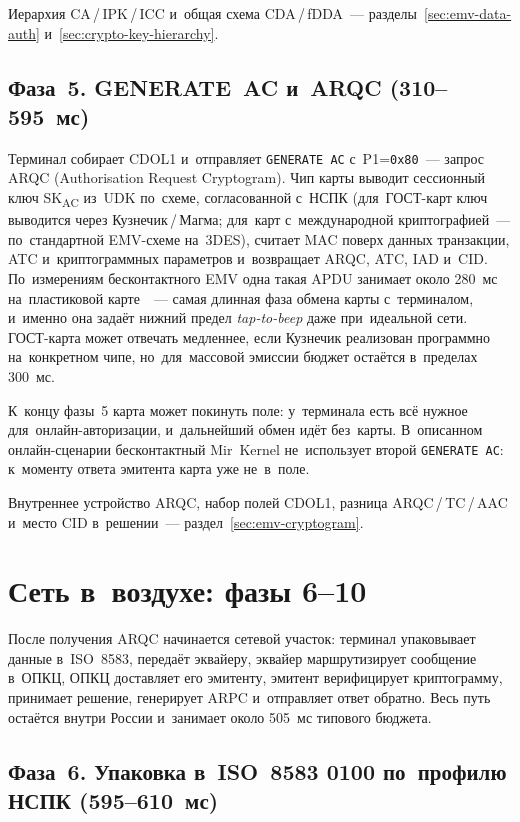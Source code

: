 Иерархия CA\,/\,IPK\,/\,ICC и~общая схема CDA\,/\,fDDA~---
разделы~\ref{sec:emv-data-auth} и~\ref{sec:crypto-key-hierarchy}.

\subsection*{Фаза~5. GENERATE~AC и~ARQC (310--595~мс)}

Терминал собирает CDOL1 и~отправляет \texttt{GENERATE~AC} с~P1=\texttt{0x80}~---
запрос ARQC (Authorisation Request Cryptogram). Чип карты
выводит сессионный ключ SK\textsubscript{AC} из~UDK по~схеме, согласованной с~НСПК
(для~ГОСТ-карт ключ выводится через Кузнечик\,/\,Магма; для~карт с~международной
криптографией~--- по~стандартной EMV-схеме на~3DES),
считает MAC поверх данных транзакции, ATC и~криптограммных параметров и~возвращает
ARQC, ATC, IAD и~CID. По~измерениям бесконтактного EMV одна такая APDU занимает
около 280~мс на~пластиковой карте~\cite{lifecycleintegrity-emv-timing}~---
самая длинная фаза обмена карты с~терминалом, и~именно она задаёт нижний
предел \textit{tap-to-beep} даже при~идеальной сети. ГОСТ-карта может отвечать
медленнее, если Кузнечик реализован программно на~конкретном чипе,
но~для~массовой эмиссии бюджет остаётся в~пределах 300~мс.

К~концу фазы~5 карта может покинуть поле: у~терминала есть всё нужное
для~онлайн-авторизации, и~дальнейший обмен идёт без~карты. В~описанном онлайн-сценарии бесконтактный Mir~Kernel
не~использует второй \texttt{GENERATE~AC}: к~моменту ответа эмитента карта уже
не~в~поле.

Внутреннее устройство ARQC, набор полей CDOL1, разница ARQC\,/\,TC\,/\,AAC
и~место CID в~решении~--- раздел~\ref{sec:emv-cryptogram}.

\section{Сеть в~воздухе: фазы 6--10}\label{sec:one-tap-network}

После получения ARQC начинается сетевой участок: терминал упаковывает данные
в~ISO~8583, передаёт эквайеру, эквайер маршрутизирует сообщение в~ОПКЦ,
ОПКЦ доставляет его эмитенту, эмитент верифицирует криптограмму, принимает
решение, генерирует ARPC и~отправляет ответ обратно. Весь путь остаётся внутри
России и~занимает около 505~мс типового бюджета.

\subsection*{Фаза~6. Упаковка в~ISO~8583 0100 по~профилю НСПК (595--610~мс)}


